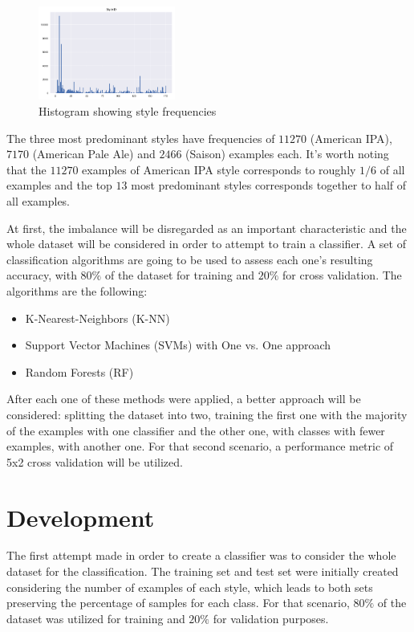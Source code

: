 \documentclass[10pt,twocolumn,letterpaper]{article}
\begin{document}
\begin{figure}[H]
\begin{center}
	\includegraphics[width=0.4\textwidth]{pics/style_hist}
	\caption{Histogram showing style frequencies\label{fig:style_hist}}   
\end{center} 
\end{figure}   

The three most predominant styles have frequencies of $11270$ (American IPA), $7170$ (American Pale Ale) and $2466$ (Saison) examples each. It's worth noting that the $11270$ examples of American IPA style corresponds to roughly $1/6$ of all examples and the top $13$ most predominant styles corresponds together to half of all examples.

At first, the imbalance will be disregarded as an important characteristic and the whole dataset will be considered in order to attempt to train a classifier. A set of classification algorithms are going to be used to assess each one's resulting accuracy, with $80\%$ of the dataset for training and $20\%$ for cross validation. The algorithms are the following:

\begin{itemize}
	\item K-Nearest-Neighbors (K-NN)
	\item Support Vector Machines (SVMs) with One vs. One approach
	\item Random Forests (RF)
\end{itemize}

After each one of these methods were applied, a better approach will be considered: splitting the dataset into two, training the first one with the majority of the examples with one classifier and the other one, with classes with fewer examples, with another one. For that second scenario, a performance metric of 5x2 cross validation will be utilized.

\section{Development}
The first attempt made in order to create a classifier was to consider the whole dataset for the classification. The training set and test set were initially created considering the number of examples of each style, which leads to both sets preserving the percentage of samples for each class. For that scenario, $80\%$ of the dataset was utilized for training and $20\%$ for validation purposes.
\end{document}
